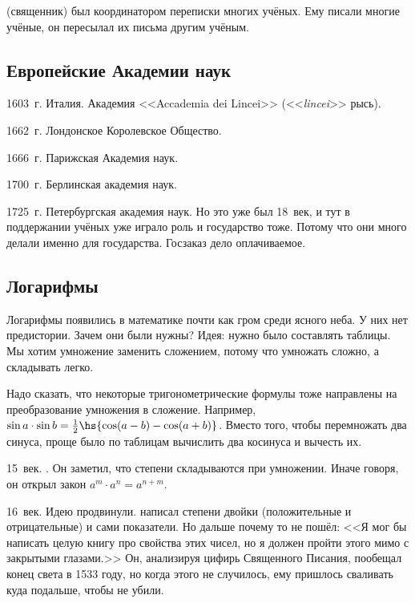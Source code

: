 \documentclass[a4paper,oneside,fleqn,10pt]{article}
\begin{document}
 (священник) был координатором переписки многих учёных.
Ему писали многие учёные, он пересылал их письма другим учёным.

\subsection{Европейские Академии наук}

\begin{items}{-2}
\item 1603~г. Италия. Академия <<Accademia dei Lincei>>
  (<<\emph{lincei}>> рысь).
\item 1662~г. Лондонское Королевское Общество.
\item 1666~г. Парижская Академия наук.
\item 1700~г. Берлинская академия наук.
\item 1725~г. Петербургская академия наук.  Но это уже был 18~век, и
  тут в поддержании учёных уже играло роль и государство тоже.  Потому
  что они много делали именно для государства. Госзаказ дело
  оплачиваемое.
\end{items}


\subsection{Логарифмы}

Логарифмы появились в математике почти как гром среди ясного неба.  У
них нет предистории. Зачем они были нужны? Идея: нужно было составлять
таблицы.  Мы хотим умножение заменить сложением, потому что умножать
сложно, а складывать легко.

Надо сказать, что некоторые тригонометрические формулы тоже направлены
на преобразование умножения в сложение. Например, $\sin a \cdot \sin b
= \frac12 \hs{\cos(a-b) - \cos(a+b)}$. Вместо того, чтобы перемножать
два синуса, проще было по таблицам вычислить два косинуса и вычесть
их.

15~век. . Он заметил, что степени
складываются при умножении.  Иначе говоря, он открыл закон $a^m \cdot
a^n = a^{n+m}$.

16~век. Идею продвинули.  написал степени двойки
(положительные и отрицательные) и сами показатели. Но дальше почему то
не пошёл: <<Я мог бы написать целую книгу про свойства этих чисел, но
я должен пройти этого мимо с закрытыми глазами.>> Он, анализируя
цифирь Священного Писания, пообещал конец света в 1533 году, но когда
этого не случилось, ему пришлось сваливать куда подальше, чтобы не
убили.
\end{document}
